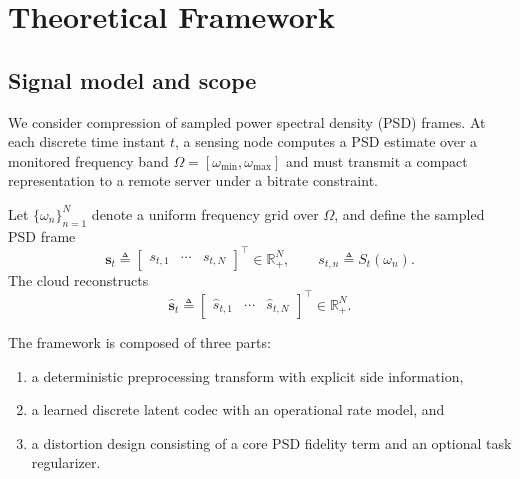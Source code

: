 \documentclass[11pt]{article}
\begin{document}
\section{Theoretical Framework}

\subsection{Signal model and scope}
We consider compression of sampled power spectral density (PSD) frames. At each discrete time instant
$t$, a sensing node computes a PSD estimate over a monitored frequency band
$\Omega = [\omega_{\min},\omega_{\max}]$ and must transmit a compact representation to a remote
server under a bitrate constraint.

Let $\{\omega_n\}_{n=1}^{N}$ denote a uniform frequency grid over $\Omega$, and define the sampled
PSD frame
\begin{equation}
\mathbf{s}_t
\triangleq
\begin{bmatrix}
s_{t,1} & \cdots & s_{t,N}
\end{bmatrix}^{\top}
\in \mathbb{R}_{+}^{N},
\qquad
s_{t,n} \triangleq S_t(\omega_n).
\end{equation}
The cloud reconstructs
\begin{equation}
\hat{\mathbf{s}}_t
\triangleq
\begin{bmatrix}
\hat{s}_{t,1} & \cdots & \hat{s}_{t,N}
\end{bmatrix}^{\top}
\in \mathbb{R}_{+}^{N}.
\end{equation}

The framework is composed of three parts:
\begin{enumerate}
    \item a deterministic preprocessing transform with explicit side information,
    \item a learned discrete latent codec with an operational rate model, and
    \item a distortion design consisting of a core PSD fidelity term and an optional task regularizer.
\end{enumerate}
\end{document}
